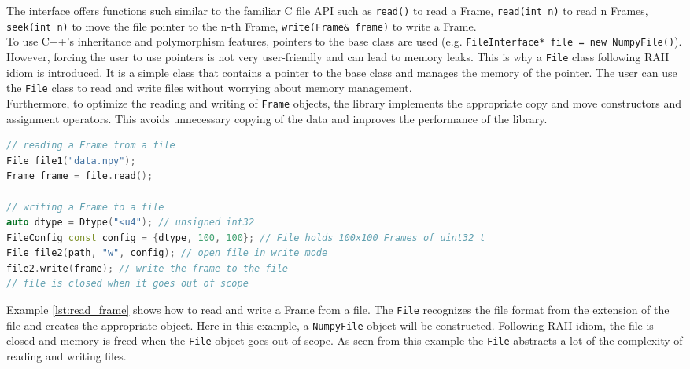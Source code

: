 \begin{spacing}{1.2}
    The interface offers functions such similar to the familiar C file API such as \lstinline|read()|
    to read a Frame, \lstinline|read(int n)| to read n Frames, \lstinline|seek(int n)| to move the
    file pointer to the n-th Frame, \lstinline|write(Frame& frame)| to write a Frame.\\

    To use C++'s inheritance and polymorphism features, pointers to the base class are used
    (e.g. \lstinline|FileInterface* file = new NumpyFile()|). However, forcing the user to use
    pointers is not very user-friendly and can lead to memory leaks. This is why a \lstinline|File|
    class following RAII idiom is introduced. It is a simple class that contains a pointer to
    the base class and manages the memory of the pointer. The user can use the \lstinline|File|
    class to read and write files without worrying about memory management.\\

    Furthermore, to optimize the reading and writing of \lstinline|Frame| objects, the
    library implements the appropriate copy and move constructors and assignment operators.
    This avoids unnecessary copying of the data and improves the performance of the library.\\

    \begin{lstlisting}[language=C++, caption={Example: Reading and writing a Frame from a file},label={lst:read_frame}]
// reading a Frame from a file
File file1("data.npy");
Frame frame = file.read();

// writing a Frame to a file
auto dtype = Dtype("<u4"); // unsigned int32
FileConfig const config = {dtype, 100, 100}; // File holds 100x100 Frames of uint32_t
File file2(path, "w", config); // open file in write mode
file2.write(frame); // write the frame to the file
// file is closed when it goes out of scope
\end{lstlisting}

    Example \ref{lst:read_frame} shows how to read and write a Frame from a file. The \lstinline|File|
    recognizes the file format from the extension of the file and creates the appropriate object.
    Here in this example, a \lstinline|NumpyFile| object will be constructed.
    Following RAII idiom, the file is closed and memory is freed when the \lstinline|File|
    object goes out of scope. As seen from this example the \lstinline|File| abstracts a lot
    of the complexity of reading and writing files.\\


\end{spacing}
